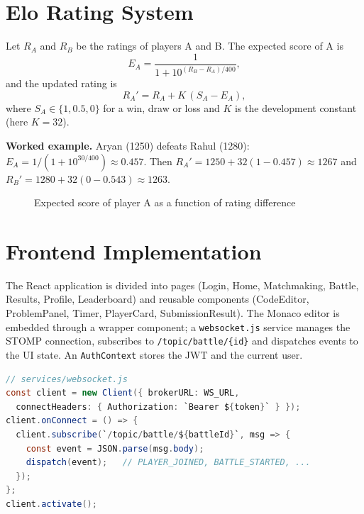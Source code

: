 \documentclass[12pt,a4paper,oneside]{report}
\begin{document}
\section{Elo Rating System}
Let $R_A$ and $R_B$ be the ratings of players A and B. The expected score of A is
\[
  E_A = \frac{1}{1 + 10^{(R_B - R_A)/400}},
\]
and the updated rating is
\[
  R_A' = R_A + K\,(S_A - E_A),
\]
where $S_A \in \{1, 0.5, 0\}$ for a win, draw or loss and $K$ is the development constant (here $K = 32$).

\textbf{Worked example.} Aryan (1250) defeats Rahul (1280): $E_A = 1/(1+10^{30/400}) \approx 0.457$.
Then $R_A' = 1250 + 32(1 - 0.457) \approx 1267$ and $R_B' = 1280 + 32(0 - 0.543) \approx 1263$.

\begin{figure}[H]
\centering
{}
\caption{Expected score of player A as a function of rating difference}
\end{figure}

\section{Frontend Implementation}
The React application is divided into pages (Login, Home, Matchmaking, Battle, Results, Profile,
Leaderboard) and reusable components (CodeEditor, ProblemPanel, Timer, PlayerCard, SubmissionResult).
The Monaco editor is embedded through a wrapper component; a \texttt{websocket.js} service manages the STOMP
connection, subscribes to \texttt{/topic/battle/\{id\}} and dispatches events to the UI state. An
\texttt{AuthContext} stores the JWT and the current user.

\begin{lstlisting}[language=Java,caption={Client-side STOMP subscription (JavaScript)},numbers=none]
// services/websocket.js
const client = new Client({ brokerURL: WS_URL,
  connectHeaders: { Authorization: `Bearer ${token}` } });
client.onConnect = () => {
  client.subscribe(`/topic/battle/${battleId}`, msg => {
    const event = JSON.parse(msg.body);
    dispatch(event);   // PLAYER_JOINED, BATTLE_STARTED, ...
  });
};
client.activate();
\end{lstlisting}
\end{document}
